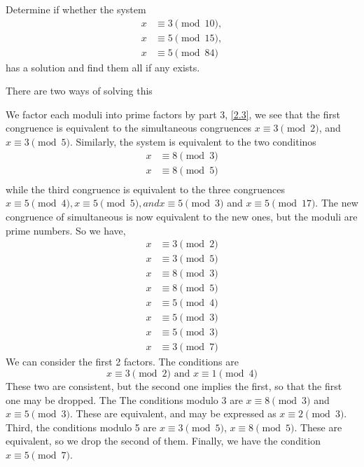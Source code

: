 \documentclass[11pt]{article}
\begin{document}
\begin{example}
	Determine if whether the system
	\[
		\begin{aligned}
			x & \equiv 3 \pmod{10}, \\
			x & \equiv 5 \pmod{15}, \\
			x & \equiv 5 \pmod{84}
		\end{aligned}
	\]
	has a solution and find them all if any exists.
\end{example}
There are two ways of solving this
\begin{solution}
	We factor each moduli into prime factors by part 3, \cref{2.3}, we see that the first congruence is equivalent to the simultaneous congruences \(x \equiv 3 \pmod{2}\), and \(x \equiv 3 \pmod{5}\). Similarly, the system is equivalent to the two conditinos
	\[\begin{aligned}
			x & \equiv 8 \pmod{3} \\
			x & \equiv 8 \pmod{5} \\
		\end{aligned}\]
	while the third congruence is equivalent to the three congruences \(x \equiv 5
	\pmod{4}, x \equiv 5 \pmod{5}, and x \equiv 5 \pmod{3}\) and \(x \equiv 5
	\pmod{17}\). The new congruence of simultaneous is now equivalent to the new
	ones, but the moduli are prime numbers. So we have,\[\begin{aligned}
			x & \equiv 3 \pmod{2} \\
			x & \equiv 3 \pmod{5} \\
			x & \equiv 8 \pmod{3} \\
			x & \equiv 8 \pmod{5} \\
			x & \equiv 5 \pmod{4} \\
			x & \equiv 5 \pmod{3} \\
			x & \equiv 5 \pmod{3} \\
			x & \equiv 3 \pmod{7}
		\end{aligned}\]
	We can consider the first 2 factors. The conditions are \[x \equiv 3 \pmod{2} \text{ and } x \equiv 1 \pmod{4}\] These two are consistent, but the second one implies the first, so that the first one may be dropped. The
	The conditions modulo 3 are \(x \equiv 8 \pmod{3}\) and \(x \equiv 5 \pmod{3}\). These are equivalent, and may be expressed as \(x \equiv 2 \pmod{3}\). Third, the conditions modulo 5 are \(x \equiv 3 \pmod{5}\), \(x \equiv 8 \pmod{5}\). These are equivalent, so we drop the second of them. Finally, we have the condition \(x \equiv 5 \pmod{7}\).

\end{solution}
\end{document}
